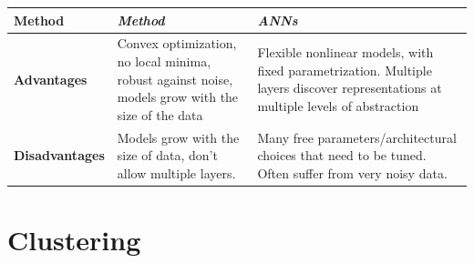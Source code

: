 \documentclass[a4paper,10pt,twoside]{article}
\begin{document}
\begin{table}
    \centering
    \begin{tabulary}{\textwidth}{Lp{170pt}p{170pt}}
        \toprule
        \textbf{Method} & \textit{Method} & \textit{ANNs}\\
        \midrule
        \textbf{Advantages} & Convex optimization, no local minima, robust against noise, models grow with the size of the data & Flexible nonlinear models, with fixed parametrization. Multiple layers discover representations at multiple levels of abstraction\\
        \textbf{Disadvantages} & Models grow with the size of data, don't allow multiple layers. & Many free parameters/architectural choices that need to be tuned. Often suffer from very noisy data.  \\
    \end{tabulary}
    \label{kernels-vs-anns}
\end{table}

\section{Clustering}
\end{document}
